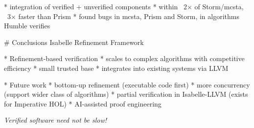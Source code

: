 \documentclass[fleqn]{beamer}
\begin{document}
  \small
  * integration of verified + unverified components
  * within ~2× of Storm/mcsta, ~3× faster than Prism
  * found bugs in mcsta, Prism and Storm, in algorithms Humble verifies


# Conclusions
  Isabelle Refinement Framework

  * Refinement-based verification
    * scales to complex algorithms with competitive efficiency
    * small trusted base
    * integrates into existing systems via LLVM

  * Future work
    * bottom-up refinement (executable code first)
    * more concurrency (support wider class of algorithms)
    * partial verification in Isabelle-LLVM (exists for Imperative HOL)
    * AI-assisted proof engineering

  \vfill\pause

  \centering\emph{Verified software need not be slow!}
\end{document}
